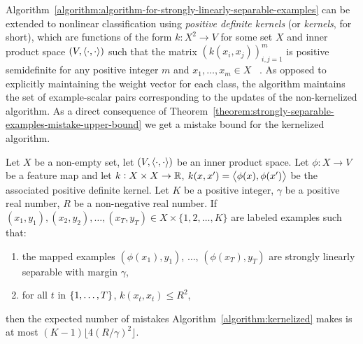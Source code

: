 Algorithm~\ref{algorithm:algorithm-for-strongly-linearly-separable-examples} can
be extended to nonlinear classification using
\emph{positive definite kernels} (or \emph{kernels}, for short), which are 
functions of the form $k: X^2 \to V$ for some set $X$ and inner product space 
$(V, \left\langle \cdot, \cdot \right\rangle)$ such that the matrix $\left(k(x_i,x_j)\right)_{i,j=1}^m$ 
is positive semidefinite for any positive integer $m$ and $x_1, \dots, x_m \in X$
~\citep[][Definition 2.5]{Scholkopf-Smola-2002}. 
As opposed to explicitly maintaining the
weight vector for each class, the algorithm maintains the set of example-scalar
pairs corresponding to the updates of the non-kernelized algorithm. As a direct
consequence of
Theorem~\ref{theorem:strongly-separable-examples-mistake-upper-bound} we get a
mistake bound for the kernelized algorithm.

\begin{theorem}
\label{theorem:kernelized-upper-bound}
Let $X$ be a non-empty set, let $(V, \left\langle \cdot, \cdot \right\rangle)$ be an inner product
space. Let $\phi:X \to V$ be a feature map and let $k:X \times X \to \mathbb{R}$,
$k(x,x') = \left\langle \phi(x), \phi(x') \right\rangle$ be the associated positive definite
kernel. Let $K$ be a positive integer, $\gamma$ be a positive real number, $R$
be a non-negative real number. If $(x_1, y_1), (x_2, y_2), \dots, (x_T, y_T) \in
X \times \{1,2,\dots,K\}$ are labeled examples such that:
\begin{enumerate}
\item the mapped examples $(\phi(x_1), y_1)$, $\dots$, $(\phi(x_T), y_T)$
are strongly linearly separable with margin $\gamma$,
\item for all $t$ in $\cbr{1,\ldots,T}$, $k(x_t,x_t) \le R^2$,
\end{enumerate}
then the expected number of mistakes Algorithm~\ref{algorithm:kernelized} makes
is at most $(K-1) \lfloor 4(R/\gamma)^2 \rfloor$.
\end{theorem}

